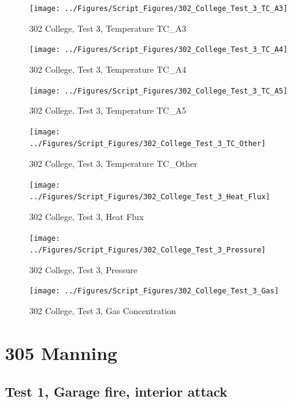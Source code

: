 \documentclass[12pt,oneside]{book}
\begin{document}
\begin{figure}[!ht]
\texttt{[image: ../Figures/Script\_Figures/302\_College\_Test\_3\_TC\_A3]}
\caption{302 College, Test 3, Temperature TC\_A3}
\label{fig:302_College_Test_3_TC_A3}
\end{figure}

\begin{figure}[!ht]
\texttt{[image: ../Figures/Script\_Figures/302\_College\_Test\_3\_TC\_A4]}
\caption{302 College, Test 3, Temperature TC\_A4}
\label{fig:302_College_Test_3_TC_A4}
\end{figure}

\begin{figure}[!ht]
\texttt{[image: ../Figures/Script\_Figures/302\_College\_Test\_3\_TC\_A5]}
\caption{302 College, Test 3, Temperature TC\_A5}
\label{fig:302_College_Test_3_TC_A5}
\end{figure}

\begin{figure}[!ht]
\texttt{[image: ../Figures/Script\_Figures/302\_College\_Test\_3\_TC\_Other]}
\caption{302 College, Test 3, Temperature TC\_Other}
\label{fig:302_College_Test_3_TC_Other}
\end{figure}

\begin{figure}[!ht]
\texttt{[image: ../Figures/Script\_Figures/302\_College\_Test\_3\_Heat\_Flux]}
\caption{302 College, Test 3, Heat Flux}
\label{fig:302_College_Test_3_Heat_Flux}
\end{figure}

\begin{figure}[!ht]
\texttt{[image: ../Figures/Script\_Figures/302\_College\_Test\_3\_Pressure]}
\caption{302 College, Test 3, Pressure}
\label{fig:302_College_Test_3_Pressure}
\end{figure}

\begin{figure}[!ht]
\texttt{[image: ../Figures/Script\_Figures/302\_College\_Test\_3\_Gas]}
\caption{302 College, Test 3, Gas Concentration}
\label{fig:302_College_Test_3_Gas}
\end{figure}


\clearpage


\section{305 Manning}

\subsection{Test 1, Garage fire, interior attack}
\end{document}
